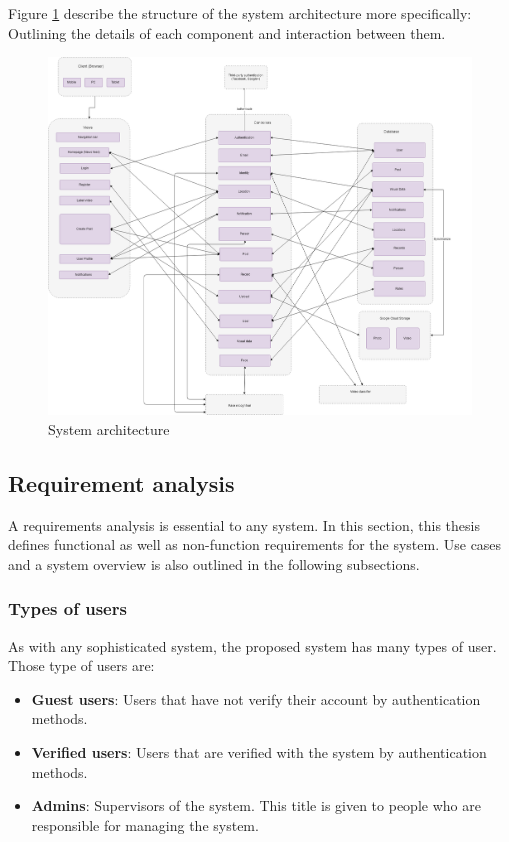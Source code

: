 Figure \ref{chap4:system_architecture} describe the structure of the system architecture more specifically: Outlining the details of each component and interaction between them.

\begin{center}
    \begin{figure}[H]
    \centering
    \includegraphics[width=1\columnwidth]{images/chap4/system_architecture.png}
    \caption{System architecture}
    \label{chap4:system_architecture}
    \end{figure}
\end{center}

\subsection{Requirement analysis}
A requirements analysis is essential to any system. In this section, this thesis defines functional as well as non-function requirements for the system. Use cases and a system overview is also outlined in the following subsections.
\subsubsection{Types of users}
As with any sophisticated system, the proposed system has many types of user. Those type of users are:

\begin{itemize}
    \item \textbf{Guest users}: Users that have not verify their account by authentication methods.
    \item \textbf{Verified users}: Users that are verified with the system by authentication methods.
    \item \textbf{Admins}: Supervisors of the system. This title is given to people who are responsible for managing the system.
\end{itemize}
